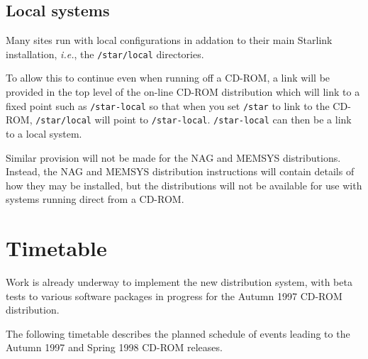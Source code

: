 \documentclass[twoside,11pt]{article}
\newcommand{\xlabel}[1]{}
\begin{document}
\subsection{\label{local_systems}\xlabel{local_systems}Local systems}

Many sites run with local configurations in addation to their main Starlink
installation, \emph{i.e.},\/ the \texttt{/star/local} directories.

To allow this to continue even when running off a CD-ROM, a link will
be provided in the top level of the on-line CD-ROM distribution which
will link to a fixed point such as \texttt{/star-local} so that when you set
\texttt{/star} to link to the CD-ROM, \texttt{/star/local} will point to
\texttt{/star-local}.  \texttt{/star-local} can then be a link to a local
system.

Similar provision will not be made for the NAG and MEMSYS
distributions.  Instead, the NAG and MEMSYS distribution instructions
will contain details of how they may be installed, but the
distributions will not be available for use with systems running direct
from a CD-ROM.

\newpage
\appendix

\section{\label{timetable}\xlabel{timetable}Timetable}

Work is already underway to implement the new distribution system, with
beta tests to various software packages in progress for the Autumn 1997 CD-ROM
distribution.

The following timetable describes the planned schedule of events leading to
the Autumn 1997 and Spring 1998 CD-ROM releases.
\end{document}
